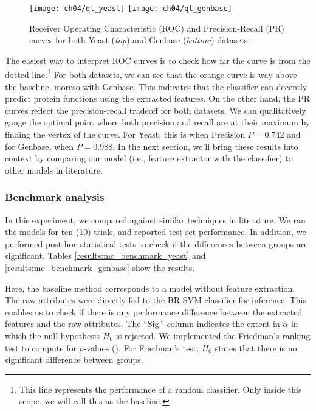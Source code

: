 \begin{figure}[!h]
  \centering
  \texttt{[image: ch04/ql\_yeast]}
  \texttt{[image: ch04/ql\_genbase]}
  \caption[Receiver Operating Characteristic (ROC) and Precision-Recall (PR)
  curves for the two protein benchmarks]{
    Receiver Operating Characteristic (ROC) and Precision-Recall (PR) curves
    for both Yeast (\textit{top}) and Genbase (\textit{bottom}) datasets.
  }
  \label{results:mc_quality}
\end{figure}

\par The easiest way to interpret ROC curves is to check how far the curve is
from the dotted line.\footnote{This line represents the performance of a
random classifier. Only inside this scope, we will call this as the
baseline.} For both datasets, we can see that the orange curve is way above
the baseline, moreso with Genbase. This indicates that the classifier can
decently predict protein functions using the extracted features. On the other
hand, the PR curves reflect the precision-recall tradeoff for both datasets.
We can qualitatively gauge the optimal point where both precision and recall
are at their maximum by finding the vertex of the curve. For Yeast, this is
when Precision $P = 0.742$ and for Genbase, when $P=0.988$. In the next
section, we'll bring these results into context by comparing our model (i.e.,
feature extractor with the classifier) to other models in literature.

\subsubsection{Benchmark analysis}

\par In this experiment, we compared against similar techniques in literature.
We ran the models for ten (10) trials, and reported test set performance. In
addition, we performed post-hoc statistical tests to check if the differences
between groups are significant. Tables \ref{results:mc_benchmark_yeast} and
\ref{results:mc_benchmark_genbase} show the results.

\par Here, the baseline method corresponds to a model without feature
extraction. The raw attributes were directly fed to the BR-SVM classifier for
inference. This enables us to check if there is any performance difference
between the extracted features and the raw attributes. The ``Sig.'' column
indicates the extent in $\alpha$ in which the null hypothesis $H_{0}$ is
rejected. We implemented the Friedman's ranking test to compute for
$p$-values (\cite{friedman1937use, demsar2006statistical}). For Friedman's
test, $H_{0}$ states that there is no significant difference between groups.

